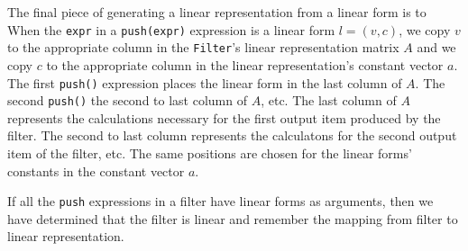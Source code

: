 The final piece of generating a linear representation from a linear form is to 
When the {\tt expr} in a {\tt push(expr)} expression is a linear form $l=(v,c)$, 
we copy $v$ to the appropriate column in the {\tt Filter}'s linear representation matrix $A$ 
and we copy $c$ to the appropriate column in the linear representation's constant vector $a$.
The first {\tt push()} expression places the linear form in the last column of $A$. The second
{\tt push()} the second to last column of $A$, etc. The last column of $A$ represents 
the calculations necessary for the first output item produced by the filter. The second to last
column represents the calculatons for the second output item of the filter, etc.
The same positions are chosen for the linear forms' constants in the constant vector $a$.

If all the {\tt push} expressions in a filter have linear forms as arguments, 
then we have determined that the filter is linear and remember the mapping from 
filter to linear representation.
